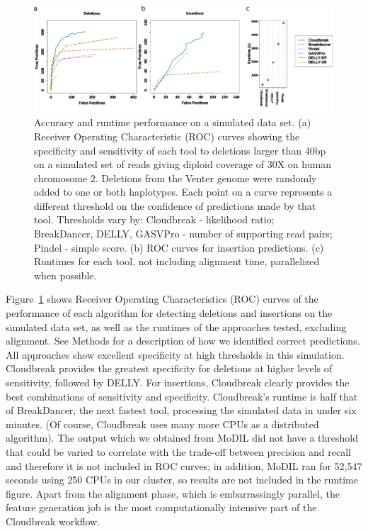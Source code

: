 \begin{figure}
\centering
\includegraphics[width=1\textwidth]{figures/chr2_sim_rocs_runtime.pdf}
\caption{Accuracy and runtime performance on a simulated data set. (a) Receiver Operating Characteristic (ROC) curves showing the specificity and sensitivity of each tool to deletions larger than 40bp on a simulated set of reads giving diploid coverage of 30X on human chromosome 2. Deletions from the Venter genome were randomly added to one or both haplotypes. Each point on a curve represents a different threshold on the confidence of predictions made by that tool. Thresholds vary by: Cloudbreak - likelihood ratio; BreakDancer, DELLY, GASVPro - number of supporting read pairs; Pindel - simple score. (b) ROC curves for insertion predictions. (c) Runtimes for each tool, not including alignment time, parallelized when possible.}
\label{chr2CombinedRoc}
\end{figure}

Figure~\ref{chr2CombinedRoc} shows Receiver Operating Characteristics (ROC) curves of the performance of each algorithm for detecting deletions and insertions on the simulated data set, as well as the runtimes of the approaches tested, excluding alignment. See Methods for a description of how we identified correct predictions. All approaches show excellent specificity at high thresholds in this simulation. Cloudbreak provides the greatest specificity for deletions at higher levels of sensitivity, followed by DELLY. For insertions, Cloudbreak clearly provides the best combinations of sensitivity and specificity. Cloudbreak's runtime is half that of BreakDancer, the next fastest tool, processing the simulated data in under six minutes. (Of course, Cloudbreak uses many more CPUs as a distributed algorithm).  The output which we obtained from MoDIL did not have a threshold that could be varied to correlate with the trade-off between precision and recall and therefore it is not included in ROC curves; in addition, MoDIL ran for 52,547 seconds using 250 CPUs in our cluster, so results are not included in the runtime figure. Apart from the alignment phase, which is embarrassingly parallel, the feature generation job is the most computationally intensive part of the Cloudbreak workflow. 

